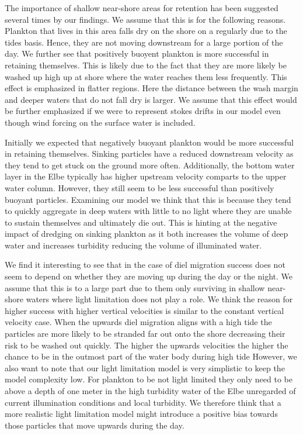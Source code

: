 The importance of shallow near-shore areas for retention has been suggested several times by our findings. 
We assume that this is for the following reasons.
Plankton that lives in this area falls dry on the shore on a regularly due to the tides basis. Hence, they are not moving downstream for a large portion of the day.
We further see that positively buoyent plankton is more successful in retaining themselves. 
This is likely due to the fact that they are more likely be washed up high up at shore where the water reaches them less frequently.
This effect is emphasized in flatter regions.
Here the distance between the wash margin and deeper waters that do not fall dry is larger. 
We assume that this effect would be further emphasized if we were to represent stokes drifts in our model even though wind forcing on the surface water is included.

Initially we expected that negatively buoyant plankton would be more successful in retaining themselves.
Sinking particles have a reduced downstream velocity as they tend to get stuck on the ground more often.
Additionally, the bottom water layer in the Elbe typically has higher upstream velocity comparts to the upper water column.
However, they still seem to be less successful than positively buoyant particles.
Examining our model we think  that this is because they tend to quickly aggregate in deep waters with little to no light where they are unable to sustain themselves and ultimately die out.
This is hinting at the negative impact of dredging on sinking plankton as it both increases the volume of deep water and increases turbidity reducing the volume of illuminated water.

We find it interesting to see that in the case of diel migration success does not seem to depend on whether they are moving up during the day or the night.
We assume that this is to a large part due to them only surviving in shallow near-shore waters where light limitation does not play a role.
We think the reason for higher success with higher vertical velocities is similar to the constant vertical velocity case.
When the upwards diel migration aligns with a high tide the particles are more likely to be stranded far out onto the shore decreasing their risk to be washed out quickly.
The higher the upwards velocities the higher the chance to be in the outmost part of the water body during high tide
However, we also want to note that our light limitation model is very simplistic to keep the model complexity low.
For plankton to be not light limited they only need to be above a depth of one meter in the high turbidity water of the Elbe unregarded of current illumination conditions and local turbidity.
We therefore think that a more realistic light limitation model might introduce a positive bias towards those particles that move upwards during the day.

